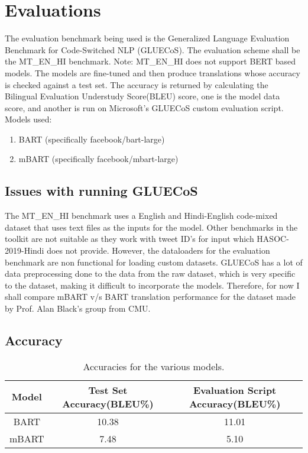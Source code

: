 \documentclass{article}
\begin{document}
\section{Evaluations}
The evaluation benchmark being used is the Generalized Language Evaluation Benchmark for Code-Switched NLP (GLUECoS).
\newline
\newline
The evaluation scheme shall be the MT\_EN\_HI benchmark.\newline
Note: MT\_EN\_HI does not support BERT based models.
The models are fine-tuned and then produce translations whose accuracy is checked against a test set.
The accuracy is returned by calculating the Bilingual Evaluation Understudy Score(BLEU) score, one is the model data score, and another is run on Microsoft's GLUECoS custom evaluation script.
\newline
\newline
Models used:
\begin{enumerate}
    \item BART (specifically facebook/bart-large)
    \item mBART (specifically facebook/mbart-large)
\end{enumerate}
\subsection{Issues with running GLUECoS}
The MT\_EN\_HI benchmark uses a English and Hindi-English code-mixed dataset that uses text files as the inputs for the model.
Other benchmarks in the toolkit are not suitable as they work with tweet ID's for input which HASOC-2019-Hindi does not provide.
However, the dataloaders for the evaluation benchmark are non functional for loading custom datasets.
GLUECoS has a lot of data preprocessing done to the data from the raw dataset, which is very specific to the dataset, making it difficult to incorporate the models.
\newline\newline
Therefore, for now I shall compare mBART v/s BART translation performance for the dataset made by Prof. Alan Black's group from CMU.

\subsection{Accuracy}

\begin{table}[h]
\centering
\begin{tabular}{c|c|c}
Model & Test Set Accuracy(BLEU\%) & Evaluation Script Accuracy(BLEU\%) \\\hline

BART & 10.38 & 11.01\\
mBART & 7.48 & 5.10
\end{tabular}
\caption{\label{tab:widgets}Accuracies for the various models.}
\end{table}
\noindent
\end{document}
